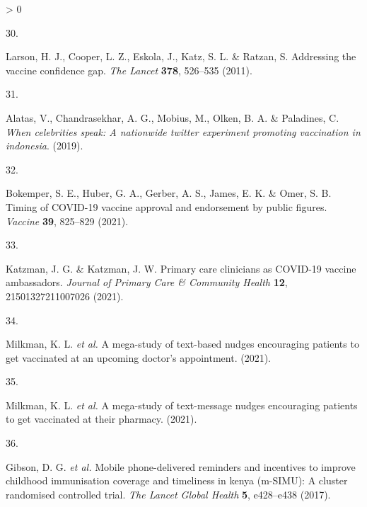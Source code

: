 \documentclass[
  12pt,
]{article}
\newlength{\cslhangindent}
\newlength{\csllabelwidth}
\newenvironment{CSLReferences}[2] %
 {%
  \setlength{\parindent}{0pt}
  \ifodd #1 \everypar{\setlength{\hangindent}{\cslhangindent}}\ignorespaces\fi
  \ifnum #2 > 0
  \setlength{\parskip}{#2\baselineskip}
  \fi
 }%
 {}
\newcommand{\CSLLeftMargin}[1]{\parbox[t]{\csllabelwidth}{#1}}
\newcommand{\CSLRightInline}[1]{\parbox[t]{\linewidth - \csllabelwidth}{#1}\break}
\providecommand{\DIFaddbegin}{} %
\providecommand{\DIFaddend}{} %
\providecommand{\DIFdelbegin}{} %
\providecommand{\DIFdelend}{} %
\newcommand{\DIFscaledelfig}{0.5}
\newlength{\DIFdelgraphicswidth} %
\newlength{\DIFdelgraphicsheight} %
\newcommand{\DIFaddincludegraphics}[2][]{{\color{blue}\fbox{\DIFOincludegraphics[#1]{#2}}}} %
\newcommand{\DIFdelincludegraphics}[2][]{%
\sbox{\DIFdelgraphicsbox}{\DIFOincludegraphics[#1]{#2}}%
\settoboxwidth{\DIFdelgraphicswidth}{\DIFdelgraphicsbox} %
\settoboxtotalheight{\DIFdelgraphicsheight}{\DIFdelgraphicsbox} %
\scalebox{\DIFscaledelfig}{%
\parbox[b]{\DIFdelgraphicswidth}{\usebox{\DIFdelgraphicsbox}\\[-\baselineskip] \rule{\DIFdelgraphicswidth}{0em}}\llap{\resizebox{\DIFdelgraphicswidth}{\DIFdelgraphicsheight}{%
\setlength{\unitlength}{\DIFdelgraphicswidth}%
\begin{picture}(1,1)%
\thicklines\linethickness{2pt} %
{\color[rgb]{1,0,0}\put(0,0){\framebox(1,1){}}}%
{\color[rgb]{1,0,0}\put(0,0){\line( 1,1){1}}}%
{\color[rgb]{1,0,0}\put(0,1){\line(1,-1){1}}}%
\end{picture}%
}\hspace*{3pt}}} %
} %
\DeclareRobustCommand{\DIFaddbegin}{\DIFOaddbegin \let\includegraphics\DIFaddincludegraphics} %
\DeclareRobustCommand{\DIFaddend}{\DIFOaddend \let\includegraphics\DIFOincludegraphics} %
\DeclareRobustCommand{\DIFdelbegin}{\DIFOdelbegin \let\includegraphics\DIFdelincludegraphics} %
\DeclareRobustCommand{\DIFdelend}{\DIFOaddend \let\includegraphics\DIFOincludegraphics} %
\begin{document}
\begin{CSLReferences}{0}{0}
\leavevmode\DIFdelbegin %
\DIFdelend \DIFaddbegin \hypertarget{ref-larson2011addressing}{}\DIFaddend %
\DIFdelbegin %
\DIFdelend \DIFaddbegin \CSLLeftMargin{30. }
\CSLRightInline{Larson, H. J., Cooper, L. Z., Eskola, J., Katz, S. L. \& Ratzan, S. Addressing the vaccine confidence gap. \emph{The Lancet} \textbf{378}, 526--535 (2011).}
\DIFaddend 

\leavevmode\hypertarget{ref-alatas2019celebrities}{}%
\DIFdelbegin %
\DIFdelend \DIFaddbegin \CSLLeftMargin{31. }
\DIFaddend \CSLRightInline{Alatas, V., Chandrasekhar, A. G., Mobius, M., Olken, B. A. \& Paladines, C. \emph{When celebrities speak: A nationwide twitter experiment promoting vaccination in indonesia}. (2019).}

\leavevmode\hypertarget{ref-bokemper2021timing}{}%
\DIFdelbegin %
\DIFdelend \DIFaddbegin \CSLLeftMargin{32. }
\DIFaddend \CSLRightInline{Bokemper, S. E., Huber, G. A., Gerber, A. S., James, E. K. \& Omer, S. B. Timing of COVID-19 vaccine approval and endorsement by public figures. \emph{Vaccine} \textbf{39}, 825--829 (2021).}

\leavevmode\DIFaddbegin \hypertarget{ref-katzman2021primary}{}%
\CSLLeftMargin{33. }
\CSLRightInline{Katzman, J. G. \& Katzman, J. W. Primary care clinicians as COVID-19 vaccine ambassadors. \emph{Journal of Primary Care \& Community Health} \textbf{12}, 21501327211007026 (2021).}

\leavevmode\DIFaddend \hypertarget{ref-milkmanetal2021a}{}%
\DIFdelbegin %
\DIFdelend \DIFaddbegin \CSLLeftMargin{34. }
\DIFaddend \CSLRightInline{Milkman, K. L. \emph{et al.} A mega-study of text-based nudges encouraging patients to get vaccinated at an upcoming doctor's appointment. (2021).}

\leavevmode\hypertarget{ref-milkmanetal2021b}{}%
\DIFdelbegin %
\DIFdelend \DIFaddbegin \CSLLeftMargin{35. }
\DIFaddend \CSLRightInline{Milkman, K. L. \emph{et al.} A mega-study of text-message nudges encouraging patients to get vaccinated at their pharmacy. (2021).}

\leavevmode\hypertarget{ref-gibsonetal2017}{}%
\DIFdelbegin %
\DIFdelend \DIFaddbegin \CSLLeftMargin{36. }
\DIFaddend \CSLRightInline{Gibson, D. G. \emph{et al.} Mobile phone-delivered reminders and incentives to improve childhood immunisation coverage and timeliness in kenya (m-SIMU): A cluster randomised controlled trial. \emph{The Lancet Global Health} \textbf{5}, e428--e438 (2017).}


\end{CSLReferences}
\end{document}
